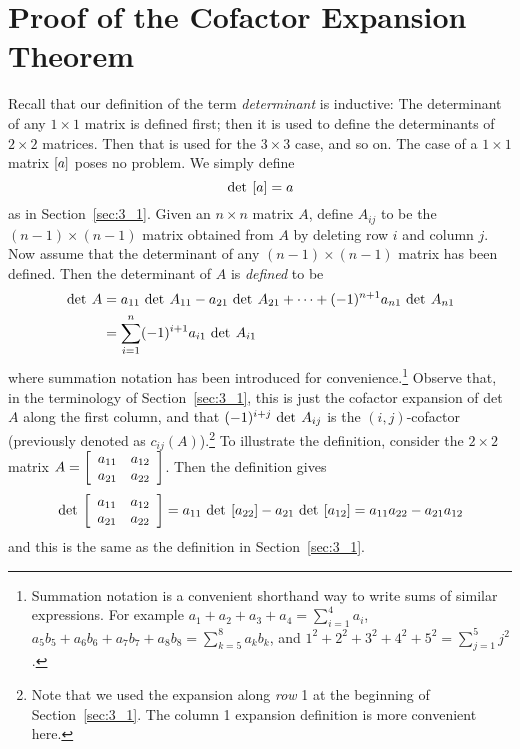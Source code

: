 \section{Proof of the Cofactor Expansion Theorem}
\label{sec:3_6}

Recall that our definition of the term \textit{determinant}
 is inductive: The determinant of any $1 \times 1$ matrix is defined first; 
then it is used to define the determinants of $2 \times 2$ matrices. Then that 
is used for the $3 \times 3$ case, and so on. The case of a $1 \times 1$ matrix $ \left[ a \right]$ poses no problem. We simply define
\begin{equation*}
\thinspace\operatorname{det\medspace} \left[ a \right] = a
\end{equation*}
as in Section~\ref{sec:3_1}. Given an $n \times n$ matrix $A$, define $A_{ij}$ to be the $(n - 1) \times (n - 1)$ matrix obtained from $A$ by deleting row $i$ and column $j$. Now assume that the determinant of any $(n - 1) \times (n - 1)$ matrix has been defined. Then the determinant of $A$ is \textit{defined} to be
\begin{align*}
\thinspace\operatorname{det \medspace} A & = a_{11} \thinspace\operatorname{det \medspace} A_{11} - a_{21} \thinspace\operatorname{det \medspace} A_{21} + \cdots + (-1)^{n+1} a_{n1} \thinspace\operatorname{det \medspace} A_{n1} \\
&= \sum_{i=1}^n (-1)^{i+1} a_{i1} \thinspace\operatorname{det \medspace}A_{i1}
\end{align*}
where summation notation has been introduced for convenience.\footnote{Summation notation is a convenient shorthand way to write sums of similar expressions. For example $a_1 +a_2 +a_3 +a_4 = \sum_{i=1}^4 a_i$, $a_5b_5 + a_6b_6 + a_7b_7 + a_8b_8 = \sum_{k=5}^8 a_kb_k$, and $1^2 +2^2 + 3^2+ 4^2 + 5^2 = \sum_{j=1}^5 j^2$.}
 Observe that, in the terminology of Section~\ref{sec:3_1}, this is just the cofactor expansion of det $A$ along the first column, and that $(-1)^{i+j} \thinspace\operatorname{det \medspace}A_{ij}$ is the $(i, j)$-cofactor (previously denoted as $c_{ij}(A)$).\footnote{Note that we used the expansion along \textit{row} 1 at the beginning of Section~\ref{sec:3_1}. The column 1 expansion definition is more convenient here.}
 To illustrate the definition, consider the $2 \times 2$ matrix $A = \left[ \begin{array}{cc}
a_{11} & a_{12} \\
a_{21} & a_{22}
\end{array}\right]$. Then the definition gives
\begin{equation*}
\thinspace\operatorname{det\medspace}\left[ \begin{array}{cc}
a_{11} & a_{12} \\
a_{21} & a_{22}
\end{array}\right] = a_{11} \thinspace\operatorname{det\medspace}\left[ a_{22} \right] - a_{21} \thinspace\operatorname{det\medspace} \left[ a_{12} \right] = a_{11} a_{22} - a_{21} a_{12}
\end{equation*}
and this is the same as the definition in Section~\ref{sec:3_1}.


